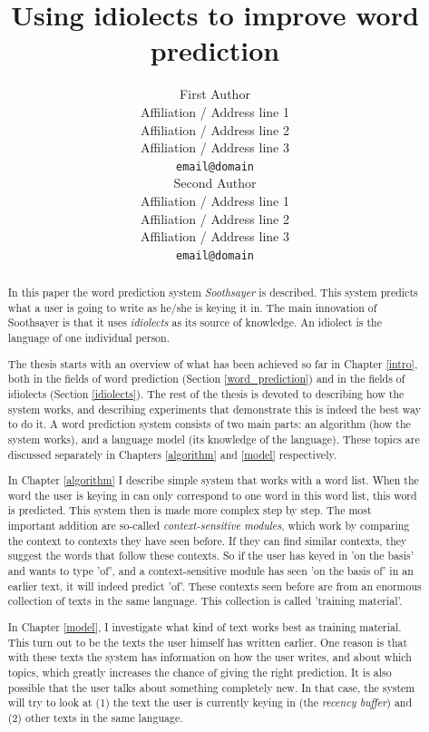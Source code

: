 \documentclass[11pt]{article}
\title{Using idiolects to improve word prediction}
\author{First Author \\
  Affiliation / Address line 1 \\
  Affiliation / Address line 2 \\
  Affiliation / Address line 3 \\
  {\tt email@domain} \\\And
  Second Author \\
  Affiliation / Address line 1 \\
  Affiliation / Address line 2 \\
  Affiliation / Address line 3 \\
  {\tt email@domain} \\}
\date{}
\begin{document}
\maketitle

\begin{abstract}
In this paper the word prediction system \emph{Soothsayer} is described. This system predicts what a user is going to write as he/she is keying it in. The main innovation of Soothsayer is that it uses \emph{idiolects} as its source of knowledge. An idiolect is the language of one individual person. 

The thesis starts with an overview of what has been achieved so far in Chapter \ref{intro}, both in the fields of word prediction (Section \ref{word_prediction}) and in the fields of idiolects (Section \ref{idiolects}). The rest of the thesis is devoted to describing how the system works, and describing experiments that demonstrate this is indeed the best way to do it. A word prediction system consists of two main parts: an algorithm (how the system works), and a language model (its knowledge of the language). These topics are discussed separately in Chapters \ref{algorithm} and \ref{model} respectively.

In Chapter \ref{algorithm} I describe simple system that works with a word list. When the word the user is keying in can only correspond to one word in this word list, this word is predicted. This system then is made more complex step by step. The most important addition are so-called \emph{context-sensitive modules}, which work by comparing the context to contexts they have seen before. If they can find similar contexts, they suggest the words that follow these contexts. So if the user has keyed in 'on the basis' and wants to type 'of', and a context-sensitive module has seen 'on the basis of' in an earlier text, it will indeed predict 'of'. These contexts seen before are from an enormous collection of texts in the same language. This collection is called 'training material'.

In Chapter \ref{model}, I investigate what kind of text works best as training material. This turn out to be the texts the user himself has written earlier. One reason is that with these texts the system has information on how the user writes, and about which topics, which greatly increases the chance of giving the right prediction. It is also possible that the user talks about something completely new. In that case, the system will try to look at (1) the text the user is currently keying in (the \emph{recency buffer}) and (2) other texts in the same language.


\end{abstract}
\end{document}
